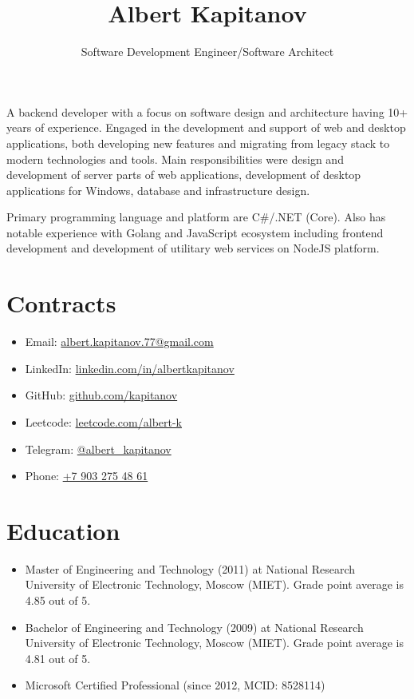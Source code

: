 \documentclass{article}
\title{Albert Kapitanov}
\author{Software Development Engineer/Software Architect}
\date{}
\begin{document}
\maketitle

A backend developer with a focus on software design and architecture having 10+ years of experience.
Engaged in the development and support of web and desktop applications, both developing new features and
migrating from legacy stack to modern technologies and tools.
Main responsibilities were design and development of server parts of
web applications, development of desktop applications for Windows, database and infrastructure
design.

Primary programming language and platform are C\#/.NET (Core). Also has notable experience with Golang and JavaScript ecosystem including frontend development and development of utilitary web services on NodeJS platform.

\section*{Contracts}

\begin{itemize}
  \item Email: \href{mailto:albert.kapitanov.77@gmail.com}{albert.kapitanov.77@gmail.com}
  \item LinkedIn: \href{https://www.linkedin.com/in/albertkapitanov}{linkedin.com/in/albertkapitanov}
  \item GitHub: \href{https://github.com/kapitanov}{github.com/kapitanov}
  \item Leetcode: \href{https://leetcode.com/albert-k}{leetcode.com/albert-k}
  \item Telegram: \href{https://t.me/albert_kapitanov}{@albert\_kapitanov}
  \item Phone: \href{tel:+79032754861}{+7 903 275 48 61}
\end{itemize}

\section*{Education}

\begin{itemize}
    \item {
        Master of Engineering and Technology (2011) at National Research University of
Electronic Technology, Moscow (MIET). Grade point average is 4.85 out of 5.
    }
    \item {
        Bachelor of Engineering and Technology (2009) at National Research University of
Electronic Technology, Moscow (MIET). Grade point average is 4.81 out of 5.
    }
    \item {
        Microsoft Certified Professional (since 2012, MCID: 8528114)
    }
\end{itemize}
\end{document}

